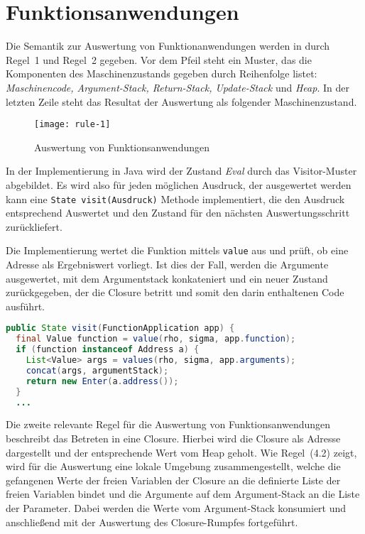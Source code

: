 \section{Funktionsanwendungen}

Die Semantik zur Auswertung von Funktionanwendungen werden in  durch Regel~1 und Regel~2 gegeben.
Vor dem Pfeil steht ein Muster, das die Komponenten des Maschinenzustands gegeben durch Reihenfolge listet: \textit{Maschinencode, Argument-Stack, Return-Stack, Update-Stack} und \textit{Heap}.
In der letzten Zeile steht das Resultat der Auswertung als folgender Maschinenzustand.

\begin{figure}[h]
  \centering
  \texttt{[image: rule-1]}
  \caption{Auswertung von Funktionsanwendungen}\label{fig:rule-1}
\end{figure}

In der Implementierung in Java wird der Zustand \textit{Eval} durch das Visitor-Muster abgebildet.
Es wird also für jeden möglichen Ausdruck, der ausgewertet werden kann eine \texttt{State visit(\texttt{Ausdruck})} Methode implementiert, die den Ausdruck entsprechend Auswertet und den Zustand für den nächsten Auswertungsschritt zurückliefert.

Die Implementierung wertet die Funktion mittels \texttt{value} aus und prüft, ob eine Adresse als Ergebniswert vorliegt.
Ist dies der Fall, werden die Argumente ausgewertet, mit dem Argumentstack konkateniert und ein neuer Zustand zurückgegeben, der die Closure betritt und somit den darin enthaltenen Code ausführt.

\begin{lstlisting}[language=java,caption={Auswertung von Funktionsanwendungen}]
public State visit(FunctionApplication app) {
  final Value function = value(rho, sigma, app.function);
  if (function instanceof Address a) {
    List<Value> args = values(rho, sigma, app.arguments);
    concat(args, argumentStack);
    return new Enter(a.address());
  }
  ...
\end{lstlisting}


Die zweite relevante Regel für die Auswertung von Funktionsanwendungen beschreibt das Betreten in eine Closure.
Hierbei wird die Closure als Adresse dargestellt und der entsprechende Wert vom Heap geholt.
Wie Regel~(4.2) zeigt, wird für die Auswertung eine lokale Umgebung zusammengestellt, welche die gefangenen Werte der freien Variablen der Closure an die definierte Liste der freien Variablen bindet und die Argumente auf dem Argument-Stack an die Liste der Parameter.
Dabei werden die Werte vom Argument-Stack konsumiert und anschließend mit der Auswertung des Closure-Rumpfes fortgeführt.

